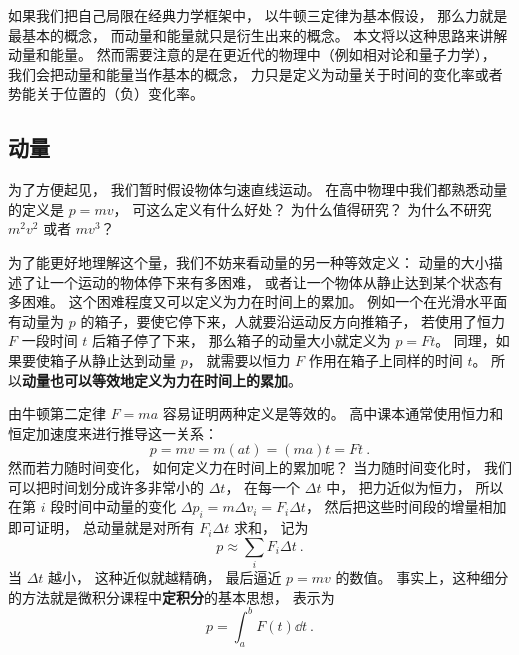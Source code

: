 
\begin{issues}
\issueTODO
\end{issues}


如果我们把自己局限在经典力学框架中， 以牛顿三定律为基本假设， 那么力就是最基本的概念， 而动量和能量就只是衍生出来的概念。 本文将以这种思路来讲解动量和能量。 然而需要注意的是在更近代的物理中（例如相对论和量子力学）， 我们会把动量和能量当作基本的概念， 力只是定义为动量关于时间的变化率或者势能关于位置的（负）变化率。

\subsection{动量}\label{sub_CM1_1}
为了方便起见， 我们暂时假设物体匀速直线运动。 在高中物理中我们都熟悉动量的定义是 $p = mv$， 可这么定义有什么好处？ 为什么值得研究？ 为什么不研究 $m^2 v^2$ 或者 $mv^3$？

为了能更好地理解这个量，我们不妨来看动量的另一种等效定义： 动量的大小描述了让一个运动的物体停下来有多困难， 或者让一个物体从静止达到某个状态有多困难。 这个困难程度又可以定义为力在时间上的累加。 例如一个在光滑水平面有动量为 $p$ 的箱子，要使它停下来，人就要沿运动反方向推箱子， 若使用了恒力 $F$ 一段时间 $t$ 后箱子停了下来， 那么箱子的动量大小就定义为 $p = Ft$。 同理，如果要使箱子从静止达到动量 $p$， 就需要以恒力 $F$ 作用在箱子上同样的时间 $t$。 所以\textbf{动量也可以等效地定义为力在时间上的累加}。

由牛顿第二定律 $F = ma$ 容易证明两种定义是等效的。 高中课本通常使用恒力和恒定加速度来进行推导这一关系：
\begin{equation}
p = mv = m(at) = (ma)t = Ft~.
\end{equation}
然而若力随时间变化， 如何定义力在时间上的累加呢？ 当力随时间变化时， 我们可以把时间划分成许多非常小的 $\Delta t$， 在每一个 $\Delta t$ 中， 把力近似为恒力， 所以在第 $i$ 段时间中动量的变化 $\Delta p_i = m\Delta v_i = F_i\Delta t$， 然后把这些时间段的增量相加即可证明， 总动量就是对所有 $F_i\Delta t$ 求和， 记为
\begin{equation}
p \approx \sum_i F_i \Delta t~.
\end{equation}
当 $\Delta t$ 越小， 这种近似就越精确， 最后逼近 $p = mv$ 的数值。 事实上，这种细分的方法就是微积分课程中\textbf{定积分}的基本思想， 表示为
\begin{equation}
p = \int_a^b F(t)\dd{t}~.
\end{equation}


